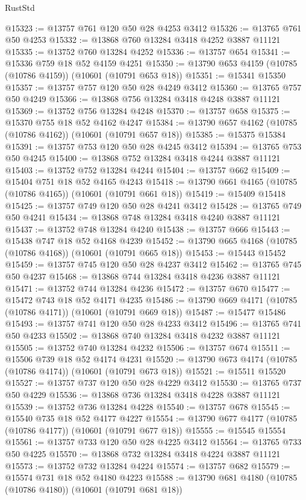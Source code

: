 \begin{lexlean}{RustStd}
\begin{coremodule}
@15323 := @13757 @761 @120 @50 @28 @4253 @3412
@15326 := @13765 @761 @50 @4253
@15332 := @13868 @760 @13284 @3418 @4252 @3887 @11121
@15335 := @13752 @760 @13284 @4252
@15336 := @13757 @654
@15341 := @15336 @759 @18 @52 @4159 @4251
@15350 := @13790 @653 @4159 (@10785 (@10786 @4159)) (@10601 (@10791 @653 @18))
@15351 := @15341 @15350
@15357 := @13757 @757 @120 @50 @28 @4249 @3412
@15360 := @13765 @757 @50 @4249
@15366 := @13868 @756 @13284 @3418 @4248 @3887 @11121
@15369 := @13752 @756 @13284 @4248
@15370 := @13757 @658
@15375 := @15370 @755 @18 @52 @4162 @4247
@15384 := @13790 @657 @4162 (@10785 (@10786 @4162)) (@10601 (@10791 @657 @18))
@15385 := @15375 @15384
@15391 := @13757 @753 @120 @50 @28 @4245 @3412
@15394 := @13765 @753 @50 @4245
@15400 := @13868 @752 @13284 @3418 @4244 @3887 @11121
@15403 := @13752 @752 @13284 @4244
@15404 := @13757 @662
@15409 := @15404 @751 @18 @52 @4165 @4243
@15418 := @13790 @661 @4165 (@10785 (@10786 @4165)) (@10601 (@10791 @661 @18))
@15419 := @15409 @15418
@15425 := @13757 @749 @120 @50 @28 @4241 @3412
@15428 := @13765 @749 @50 @4241
@15434 := @13868 @748 @13284 @3418 @4240 @3887 @11121
@15437 := @13752 @748 @13284 @4240
@15438 := @13757 @666
@15443 := @15438 @747 @18 @52 @4168 @4239
@15452 := @13790 @665 @4168 (@10785 (@10786 @4168)) (@10601 (@10791 @665 @18))
@15453 := @15443 @15452
@15459 := @13757 @745 @120 @50 @28 @4237 @3412
@15462 := @13765 @745 @50 @4237
@15468 := @13868 @744 @13284 @3418 @4236 @3887 @11121
@15471 := @13752 @744 @13284 @4236
@15472 := @13757 @670
@15477 := @15472 @743 @18 @52 @4171 @4235
@15486 := @13790 @669 @4171 (@10785 (@10786 @4171)) (@10601 (@10791 @669 @18))
@15487 := @15477 @15486
@15493 := @13757 @741 @120 @50 @28 @4233 @3412
@15496 := @13765 @741 @50 @4233
@15502 := @13868 @740 @13284 @3418 @4232 @3887 @11121
@15505 := @13752 @740 @13284 @4232
@15506 := @13757 @674
@15511 := @15506 @739 @18 @52 @4174 @4231
@15520 := @13790 @673 @4174 (@10785 (@10786 @4174)) (@10601 (@10791 @673 @18))
@15521 := @15511 @15520
@15527 := @13757 @737 @120 @50 @28 @4229 @3412
@15530 := @13765 @737 @50 @4229
@15536 := @13868 @736 @13284 @3418 @4228 @3887 @11121
@15539 := @13752 @736 @13284 @4228
@15540 := @13757 @678
@15545 := @15540 @735 @18 @52 @4177 @4227
@15554 := @13790 @677 @4177 (@10785 (@10786 @4177)) (@10601 (@10791 @677 @18))
@15555 := @15545 @15554
@15561 := @13757 @733 @120 @50 @28 @4225 @3412
@15564 := @13765 @733 @50 @4225
@15570 := @13868 @732 @13284 @3418 @4224 @3887 @11121
@15573 := @13752 @732 @13284 @4224
@15574 := @13757 @682
@15579 := @15574 @731 @18 @52 @4180 @4223
@15588 := @13790 @681 @4180 (@10785 (@10786 @4180)) (@10601 (@10791 @681 @18))

\end{coremodule}
\end{lexlean}
